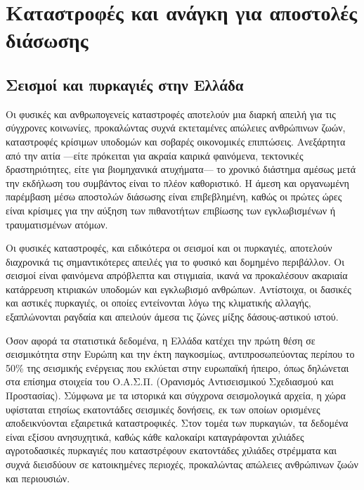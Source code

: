 \section{Καταστροφές και ανάγκη για αποστολές διάσωσης}
\subsection{Σεισμοί και πυρκαγιές στην Ελλάδα}

Οι φυσικές και ανθρωπογενείς καταστροφές αποτελούν μια διαρκή απειλή για τις σύγχρονες κοινωνίες, προκαλώντας συχνά εκτεταμένες απώλειες ανθρώπινων ζωών, καταστροφές κρίσιμων υποδομών και σοβαρές οικονομικές επιπτώσεις. Ανεξάρτητα από την αιτία —είτε πρόκειται για ακραία καιρικά φαινόμενα, τεκτονικές δραστηριότητες, είτε για βιομηχανικά ατυχήματα— το χρονικό διάστημα αμέσως μετά την εκδήλωση του συμβάντος είναι το πλέον καθοριστικό. Η άμεση και οργανωμένη παρέμβαση μέσω αποστολών διάσωσης είναι επιβεβλημένη, καθώς οι πρώτες ώρες είναι κρίσιμες για την αύξηση των πιθανοτήτων επιβίωσης των εγκλωβισμένων ή τραυματισμένων ατόμων.

\par Οι φυσικές καταστροφές, και ειδικότερα οι σεισμοί και οι πυρκαγιές, αποτελούν διαχρονικά τις σημαντικότερες απειλές για το φυσικό και δομημένο περιβάλλον. Οι σεισμοί είναι φαινόμενα απρόβλεπτα και στιγμιαία, ικανά να προκαλέσουν ακαριαία κατάρρευση κτιριακών υποδομών και εγκλωβισμό ανθρώπων. Αντίστοιχα, οι δασικές και αστικές πυρκαγιές, οι οποίες εντείνονται λόγω της κλιματικής αλλαγής, εξαπλώνονται ραγδαία και απειλούν άμεσα τις ζώνες μίξης δάσους-αστικού ιστού.

\par Όσον αφορά τα στατιστικά δεδομένα, η Ελλάδα κατέχει την πρώτη θέση σε σεισμικότητα στην Ευρώπη και την έκτη παγκοσμίως, αντιπροσωπεύοντας περίπου το 50\% της σεισμικής ενέργειας που εκλύεται στην ευρωπαϊκή ήπειρο, όπως δηλώνεται στα επίσημα στοιχεία του Ο.Α.Σ.Π. (Ορανισμός Αντισεισμικού Σχεδιασμού και Προστασίας). Σύμφωνα με τα ιστορικά και σύγχρονα σεισμολογικά αρχεία, η χώρα υφίσταται ετησίως εκατοντάδες σεισμικές δονήσεις, εκ των οποίων ορισμένες αποδεικνύονται εξαιρετικά καταστροφικές. Στον τομέα των πυρκαγιών, τα δεδομένα είναι εξίσου ανησυχητικά, καθώς κάθε καλοκαίρι καταγράφονται χιλιάδες αγροτοδασικές πυρκαγιές που καταστρέφουν εκατοντάδες χιλιάδες στρέμματα και συχνά διεισδύουν σε κατοικημένες περιοχές, προκαλώντας απώλειες ανθρώπινων ζωών και περιουσιών.


